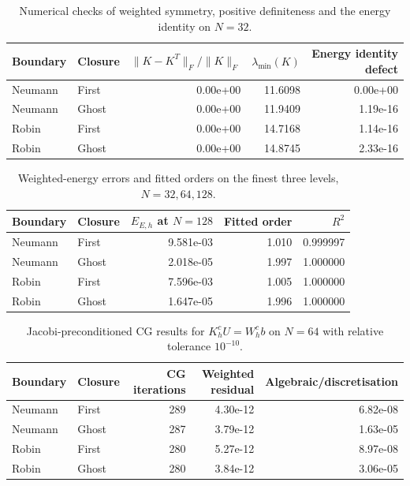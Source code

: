 \begin{table}[htbp]
\centering
\small
\begin{tabular}{llrrr}
\hline
Boundary & Closure & $\|K-K^T\|_F/\|K\|_F$ & $\lambda_{\min}(K)$ & Energy identity defect \\
\hline
Neumann & First & 0.00e+00 & 11.6098 & 0.00e+00 \\
Neumann & Ghost & 0.00e+00 & 11.9409 & 1.19e-16 \\
Robin & First & 0.00e+00 & 14.7168 & 1.14e-16 \\
Robin & Ghost & 0.00e+00 & 14.8745 & 2.33e-16 \\
\hline
\end{tabular}
\caption{Numerical checks of weighted symmetry, positive definiteness and the energy identity on $N=32$.}
\label{tab:weighted-diagnostics}
\end{table}

\begin{table}[htbp]
\centering
\small
\begin{tabular}{llrrr}
\hline
Boundary & Closure & $E_{E,h}$ at $N=128$ & Fitted order & $R^2$ \\
\hline
Neumann & First & 9.581e-03 & 1.010 & 0.999997 \\
Neumann & Ghost & 2.018e-05 & 1.997 & 1.000000 \\
Robin & First & 7.596e-03 & 1.005 & 1.000000 \\
Robin & Ghost & 1.647e-05 & 1.996 & 1.000000 \\
\hline
\end{tabular}
\caption{Weighted-energy errors and fitted orders on the finest three levels, $N=32,64,128$.}
\label{tab:energy-convergence}
\end{table}

\begin{table}[htbp]
\centering
\small
\begin{tabular}{llrrr}
\hline
Boundary & Closure & CG iterations & Weighted residual & Algebraic/discretisation \\
\hline
Neumann & First & 289 & 4.30e-12 & 6.82e-08 \\
Neumann & Ghost & 287 & 3.79e-12 & 1.63e-05 \\
Robin & First & 280 & 5.27e-12 & 8.97e-08 \\
Robin & Ghost & 280 & 3.84e-12 & 3.06e-05 \\
\hline
\end{tabular}
\caption{Jacobi-preconditioned CG results for $K_h^cU=W_h^cb$ on $N=64$ with relative tolerance $10^{-10}$.}
\label{tab:weighted-cg}
\end{table}

